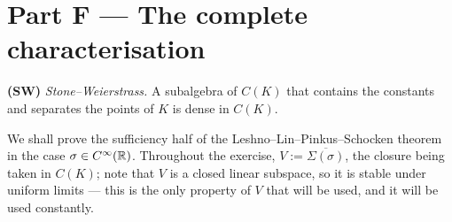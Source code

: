 \documentclass[11pt,a4paper]{article}
\begin{document}
\section{Part F --- The complete characterisation}

\begin{setting}
\textbf{(SW)} \emph{Stone--Weierstrass.} A subalgebra of $C(K)$ that contains the constants and
separates the points of $K$ is dense in $C(K)$.

\smallskip
We shall prove the sufficiency half of the Leshno--Lin--Pinkus--Schocken theorem in the case
$\sigma \in C^\infty(\mathbb{R})$. Throughout the exercise, $V := \overline{\Sigma(\sigma)}$, the closure
being taken in $C(K)$; note that $V$ is a closed linear subspace, so it is stable under uniform
limits --- this is the only property of $V$ that will be used, and it will be used constantly.
\end{setting}
\end{document}
